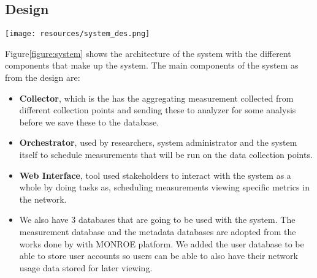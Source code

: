 \subsection{Design}\label{subsec:design}
\begin{figure*}
    \begin{center}
        \texttt{[image: resources/system\_des.png]}
    \end{center}
    \caption{Showing the system overview, different components making the system and the communication directions between these components in the systems.}
    \label{figure:system}
\end{figure*}
Figure\ref{figure:system} shows the architecture of the system with the different components that make up the system.
The main components of the system as from the design are:
\begin{itemize}
    \item \textbf{Collector}, which is the has the aggregating measurement collected from different collection points and sending these to analyzer for some analysis before we save these to the database.
    \item \textbf{Orchestrator}, used by researchers, system administrator and the system itself to schedule measurements that will be run on the data collection points.
    \item \textbf{Web Interface}, tool used stakeholders to interact with the system as a whole by doing tasks as, scheduling measurements viewing specific metrics in the network.
    \item We also have 3 databases that are going to be used with the system.
    The measurement database and the metadata databases are adopted from the works done by\cite{7523537} with MONROE platform.
    We added the user database to be able to store user accounts so users can be able to also have their network usage data stored for later viewing.
\end{itemize}
